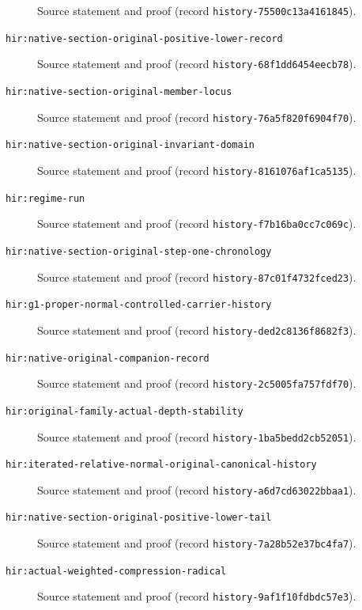 \begin{description}
Source statement and proof (record \texttt{history-75500c13a4161845}).
\item[\texttt{hir:native-section-original-positive-lower-record}]\label{hir:native-section-original-positive-lower-record}
Source statement and proof (record \texttt{history-68f1dd6454eecb78}).
\item[\texttt{hir:native-section-original-member-locus}]\label{hir:native-section-original-member-locus}
Source statement and proof (record \texttt{history-76a5f820f6904f70}).
\item[\texttt{hir:native-section-original-invariant-domain}]\label{hir:native-section-original-invariant-domain}
Source statement and proof (record \texttt{history-8161076af1ca5135}).
\item[\texttt{hir:regime-run}]\label{hir:regime-run}
Source statement and proof (record \texttt{history-f7b16ba0cc7c069c}).
\item[\texttt{hir:native-section-original-step-one-chronology}]\label{hir:native-section-original-step-one-chronology}
Source statement and proof (record \texttt{history-87c01f4732fced23}).
\item[\texttt{hir:g1-proper-normal-controlled-carrier-history}]\label{hir:g1-proper-normal-controlled-carrier-history}
Source statement and proof (record \texttt{history-ded2c8136f8682f3}).
\item[\texttt{hir:native-original-companion-record}]\label{hir:native-original-companion-record}
Source statement and proof (record \texttt{history-2c5005fa757fdf70}).
\item[\texttt{hir:original-family-actual-depth-stability}]\label{hir:original-family-actual-depth-stability}
Source statement and proof (record \texttt{history-1ba5bedd2cb52051}).
\item[\texttt{hir:iterated-relative-normal-original-canonical-history}]\label{hir:iterated-relative-normal-original-canonical-history}
Source statement and proof (record \texttt{history-a6d7cd63022bbaa1}).
\item[\texttt{hir:native-section-original-positive-lower-tail}]\label{hir:native-section-original-positive-lower-tail}
Source statement and proof (record \texttt{history-7a28b52e37bc4fa7}).
\item[\texttt{hir:actual-weighted-compression-radical}]\label{hir:actual-weighted-compression-radical}
Source statement and proof (record \texttt{history-9af1f10fdbdc57e3}).

\end{description}
